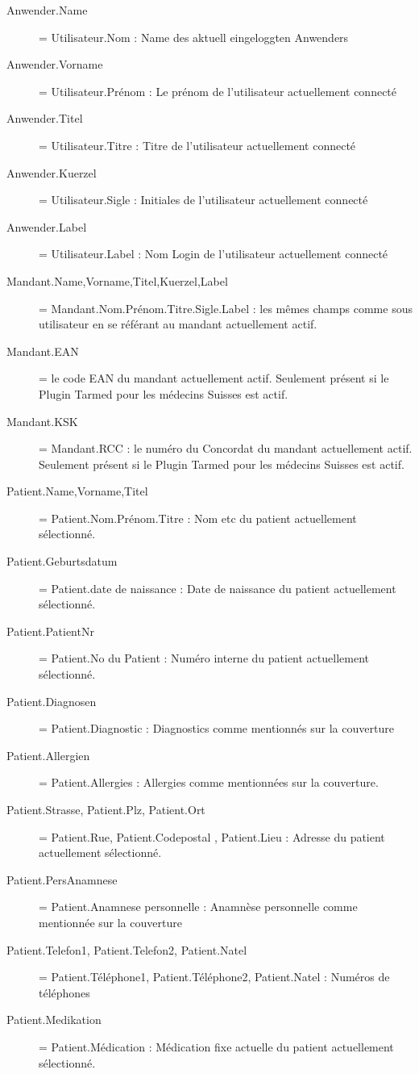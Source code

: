 \begin{description}
  \item [Anwender.Name]= Utilisateur.Nom :  Name des aktuell eingeloggten Anwenders
  \item [Anwender.Vorname] = Utilisateur.Prénom : Le prénom de l'utilisateur actuellement connecté
  \item [Anwender.Titel] = Utilisateur.Titre : Titre de l'utilisateur actuellement connecté
  \item [Anwender.Kuerzel]= Utilisateur.Sigle : Initiales de l'utilisateur actuellement connecté
  \item [Anwender.Label] = Utilisateur.Label : Nom Login de l'utilisateur actuellement connecté
  \item [Mandant.Name,Vorname,Titel,Kuerzel,Label] = Mandant.Nom.Prénom.Titre.Sigle.Label : les mêmes champs comme sous utilisateur en se référant au mandant actuellement actif.	
  \item [Mandant.EAN] = le code EAN du mandant actuellement actif. Seulement présent si le Plugin Tarmed pour les médecins Suisses est actif.
  \item [Mandant.KSK] = Mandant.RCC : le numéro du Concordat du mandant actuellement actif. Seulement présent si le Plugin Tarmed pour les médecins Suisses est actif.
  \item [Patient.Name,Vorname,Titel]= Patient.Nom.Prénom.Titre : Nom etc du patient actuellement sélectionné.
  \item [Patient.Geburtsdatum] = Patient.date de naissance : Date de naissance du patient actuellement sélectionné.
  \item [Patient.PatientNr] = Patient.No du Patient : Numéro interne du patient actuellement sélectionné.
  \item [Patient.Diagnosen] = Patient.Diagnostic : Diagnostics comme mentionnés sur la couverture
  \item [Patient.Allergien]= Patient.Allergies : Allergies comme mentionnées sur la couverture.
  \item [Patient.Strasse, Patient.Plz, Patient.Ort] = Patient.Rue, Patient.Codepostal , Patient.Lieu : Adresse du patient actuellement sélectionné.
  \item [Patient.PersAnamnese] = Patient.Anamnese personnelle : Anamnèse personnelle comme mentionnée sur la couverture
  \item [Patient.Telefon1, Patient.Telefon2, Patient.Natel] = Patient.Téléphone1, Patient.Téléphone2, Patient.Natel : Numéros de téléphones
  \item [Patient.Medikation] = Patient.Médication : Médication fixe actuelle du patient actuellement sélectionné.

\end{description}
